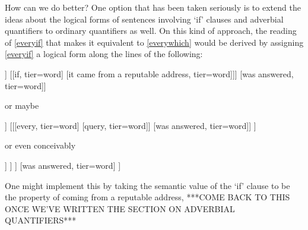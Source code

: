 \documentclass[If.tex]{subfiles}
\begin{document}

How can we do better?  One option that has been taken seriously is to extend the ideas about the logical forms of sentences involving ‘if’ clauses and adverbial quantifiers to ordinary quantifiers as well.  On this kind of approach, the reading of \ref{everyif} that makes it equivalent to \ref{everywhich} would be derived by assigning \ref{everyif} a logical form along the lines of the following:
\begin{center}
	\begin{forest}
		[[[[Every, tier=word] [query, tier=word]] [[if, tier=word] [it came from a reputable address, tier=word]]] [was answered, tier=word]]
	\end{forest}
\end{center}
or maybe
\begin{center}
	\begin{forest}
		[
			[[If, tier=word] [it came from a reputable address, tier=word]] 
			[[[every, tier=word] [query, tier=word]] [was answered, tier=word]]
		]
	\end{forest}
\end{center}
or even conceivably
\begin{center}
	\begin{forest}
		[
			[
				[Every, tier=word] 
				[
					[query, tier=word] 
					[[if, tier=word] [it came from a reputable address, tier=word]]
				]
			] 
			[was answered, tier=word]
		]
	\end{forest}
\end{center}
One might implement this by taking the semantic value of the ‘if’ clause to be the property of coming from a reputable address, 
***COME BACK TO THIS ONCE WE'VE WRITTEN THE SECTION ON ADVERBIAL QUANTIFIERS***
\end{document}
